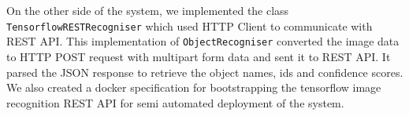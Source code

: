 


On the other side of the system, we implemented the class \texttt{TensorflowRESTRecogniser} which used HTTP Client to communicate with REST API. This implementation of \texttt{ObjectRecogniser} converted the image data to HTTP POST request with multipart form data and sent it to REST API. It parsed the JSON response to retrieve the object names, ids and confidence scores. We also created a docker specification for bootstrapping the tensorflow image recognition REST API for semi automated deployment of the system.


